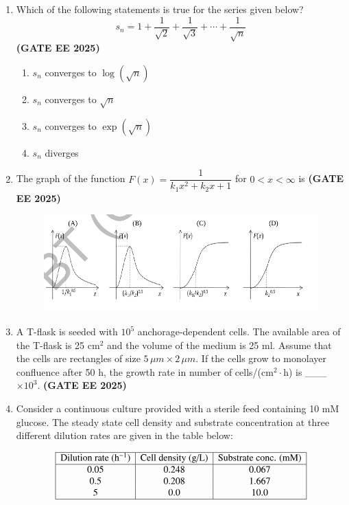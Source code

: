\documentclass[journal,12pt,onecolumn]{IEEEtran}
\theoremstyle{remark}
\begin{document}
\begin{enumerate}
\item  Which of the following statements is true for the series given below?
\[
s_n = 1 + \frac{1}{\sqrt{2}} + \frac{1}{\sqrt{3}} + \cdots + \frac{1}{\sqrt{n}}
\] \hfill \textbf{(GATE EE 2025)}
\begin{enumerate}
\item  $s_n$ converges to $\log (\sqrt{n})$
\item  $s_n$ converges to $\sqrt{n}$
\item  $s_n$ converges to $\exp (\sqrt{n})$
\item  $s_n$ diverges
\end{enumerate}

\item  The graph of the function $F(x)= \dfrac{1}{k_1x^{2}+k_2x +1}$ for $0<x<\infty$ is \hfill \textbf{(GATE EE 2025)}  
\begin{figure}[H]
    \centering
    \includegraphics[width=0.6\linewidth]{figs/fig2.png}
    \caption{ }
    \label{fig2}
\end{figure}

\item  A T-flask is seeded with $10^5$ anchorage-dependent cells. The available area of the T-flask is 25 cm$^2$ and the volume of the medium is 25 ml. Assume that the cells are rectangles of size $5 \,\mu m \times 2 \,\mu m$. If the cells grow to monolayer confluence after 50 h, the growth rate in number of cells/(cm$^2\cdot$h) is \_\_\_ $\times 10^3$. \hfill \textbf{(GATE EE 2025)}
\item  Consider a continuous culture provided with a sterile feed containing 10 mM glucose. The steady state cell density and substrate concentration at three different dilution rates are given in the table below:

\[
\begin{array}{|c|c|c|}
\hline
\text{Dilution rate (h$^{-1}$)} & \text{Cell density (g/L)} & \text{Substrate conc. (mM)} \\
\hline
0.05 & 0.248 & 0.067 \\
0.5 & 0.208 & 1.667 \\
5 & 0.0 & 10.0 \\
\hline
\end{array}
\]


\end{enumerate}
\end{document}
